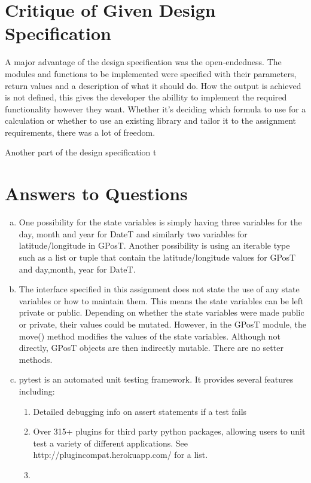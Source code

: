 \documentclass[12pt]{article}
\begin{document}
\section{Critique of Given Design Specification}

A major advantage of the design specification was the open-endedness. The modules and functions to be implemented were specified with their parameters, return values and a description of what it should do. How the output is achieved is not defined, this gives the developer the abillity to implement the required functionality however they want. Whether it's deciding which formula to use for a calculation or whether to use an existing library and tailor it to the assignment requirements, there was a lot of freedom. 

Another part of the design specification t

\section{Answers to Questions}

\begin{enumerate}[(a)]

\item One possibility for the state variables is simply having three variables for the day, month and year for DateT and similarly two variables for latitude/longitude in GPosT. Another possibility is using an iterable type such as a list or tuple that contain the latitude/longitude values for GPosT and day,month, year for DateT.

\item The interface specified in this assignment does not state the use of any state variables or how to maintain them. This means the state variables can be left private or public. Depending on whether the state variables were made public or private, their values could be mutated. However, in the GPosT module, the move() method modifies the values of the state variables. Although not directly, GPosT objects are then indirectly mutable. There are no setter methods. 

\item pytest is an automated unit testing framework. It provides several features including:
\begin{enumerate}[(1)]

\item Detailed debugging info on assert statements if a test fails
\item Over 315+ plugins for third party python packages, allowing users to unit test a variety of different applications. See http://plugincompat.herokuapp.com/ for a list.
\item

\end{enumerate}


\end{enumerate}
\end{document}
